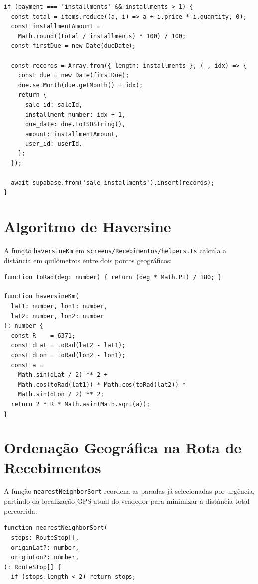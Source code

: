 \documentclass[
	12pt,				%
	oneside,			%
	a4paper,			%
	english,			%
	brazil				%
	]{abntex2}
\begin{document}
\begin{apendicesenv}
\begin{verbatim}
if (payment === 'installments' && installments > 1) {
  const total = items.reduce((a, i) => a + i.price * i.quantity, 0);
  const installmentAmount =
    Math.round((total / installments) * 100) / 100;
  const firstDue = new Date(dueDate);

  const records = Array.from({ length: installments }, (_, idx) => {
    const due = new Date(firstDue);
    due.setMonth(due.getMonth() + idx);
    return {
      sale_id: saleId,
      installment_number: idx + 1,
      due_date: due.toISOString(),
      amount: installmentAmount,
      user_id: userId,
    };
  });

  await supabase.from('sale_installments').insert(records);
}
\end{verbatim}

\section{Algoritmo de Haversine}

A função \texttt{haversineKm} em \texttt{screens/Recebimentos/helpers.ts} calcula a distância em quilômetros entre dois pontos geográficos:

\begin{verbatim}
function toRad(deg: number) { return (deg * Math.PI) / 180; }

function haversineKm(
  lat1: number, lon1: number,
  lat2: number, lon2: number
): number {
  const R    = 6371;
  const dLat = toRad(lat2 - lat1);
  const dLon = toRad(lon2 - lon1);
  const a =
    Math.sin(dLat / 2) ** 2 +
    Math.cos(toRad(lat1)) * Math.cos(toRad(lat2)) *
    Math.sin(dLon / 2) ** 2;
  return 2 * R * Math.asin(Math.sqrt(a));
}
\end{verbatim}

\section{Ordenação Geográfica na Rota de Recebimentos}

A função \texttt{nearestNeighborSort} reordena as paradas já selecionadas por urgência, partindo da localização GPS atual do vendedor para minimizar a distância total percorrida:

\begin{verbatim}
function nearestNeighborSort(
  stops: RouteStop[],
  originLat?: number,
  originLon?: number,
): RouteStop[] {
  if (stops.length < 2) return stops;


\end{verbatim}
\end{apendicesenv}
\end{document}
